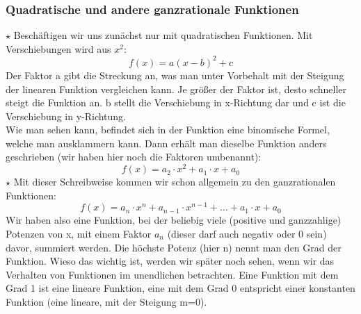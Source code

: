 	\subsubsection{Quadratische und andere ganzrationale Funktionen}
\(\star\) Beschäftigen wir uns zunächst nur mit quadratischen Funktionen. Mit Verschiebungen wird aus \(x^2\):
\[f(x)=a(x-b)^2+c\]
Der Faktor a gibt die Streckung an, was man unter Vorbehalt mit der Steigung der linearen Funktion vergleichen kann. Je größer der Faktor ist, desto schneller steigt die Funktion an. b  stellt die Verschiebung in x-Richtung dar und c ist die Verschiebung in y-Richtung.\\
Wie man sehen kann, befindet sich in der Funktion eine binomische Formel, welche man ausklammern kann. Dann erhält man dieselbe Funktion anders geschrieben (wir haben hier noch die Faktoren umbenannt):
\[f(x)=a_2 \cdot x^2+a_1 \cdot x+a_0\]
\(\star\) Mit dieser Schreibweise kommen wir schon allgemein zu den ganzrationalen Funktionen:
\[f(x)=a_n \cdot x^n+a_{n-1} \cdot x^{n-1}+\ldots +a_1 \cdot x+a_0\]
Wir haben also eine Funktion, bei der beliebig viele (positive und ganzzahlige) Potenzen von x, mit einem Faktor \(a_n\) (dieser darf auch negativ oder 0 sein) davor, summiert werden. Die höchste Potenz (hier n) nennt man den Grad der Funktion. Wieso das wichtig ist, werden wir später noch sehen, wenn wir das Verhalten von Funktionen im unendlichen betrachten. Eine Funktion mit dem Grad 1 ist eine lineare Funktion, eine mit dem Grad 0 entspricht einer konstanten Funktion (eine lineare, mit der Steigung m=0).



